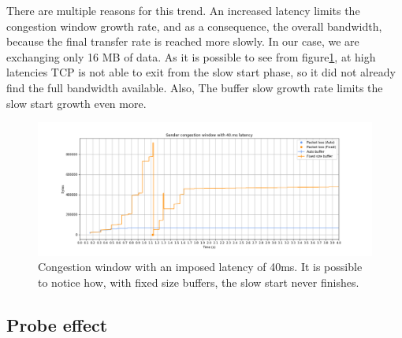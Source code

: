 \documentclass[a4paper,10pt]{article}
\begin{document}
There are multiple reasons for this trend. 
An increased latency limits the congestion window growth rate, and as a consequence, the overall bandwidth, because the final transfer rate is reached more slowly. In our case, we are exchanging only 16 MB of data. As it is possible to see from figure\ref{fig:40_cwnd}, at high latencies TCP is not able to exit from the slow start phase, so it did not already find the full bandwidth available.
Also, The buffer slow growth rate limits the slow start growth even more.


\begin{figure}[h]
\centering
\includegraphics[width=\textwidth]{images/40_cwnd_comparison.png}
\caption{Congestion window with an imposed latency of 40ms. It is possible to notice how, with fixed size buffers, the slow start never finishes.}
\label{fig:40_cwnd}
\end{figure}

\subsection{Probe effect}
\end{document}
